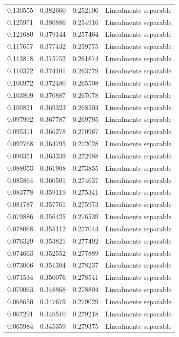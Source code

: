 \begin{tabular}{llll}
0.130555 & 0.382660 & 0.252106 & Linealmente separable \\
0.125971 & 0.380886 & 0.254916 & Linealmente separable \\
0.121680 & 0.379144 & 0.257464 & Linealmente separable \\
0.117657 & 0.377432 & 0.259775 & Linealmente separable \\
0.113878 & 0.375752 & 0.261874 & Linealmente separable \\
0.110322 & 0.374101 & 0.263779 & Linealmente separable \\
0.106972 & 0.372480 & 0.265508 & Linealmente separable \\
0.103809 & 0.370887 & 0.267078 & Linealmente separable \\
0.100821 & 0.369323 & 0.268503 & Linealmente separable \\
0.097992 & 0.367787 & 0.269795 & Linealmente separable \\
0.095311 & 0.366278 & 0.270967 & Linealmente separable \\
0.092768 & 0.364795 & 0.272028 & Linealmente separable \\
0.090351 & 0.363339 & 0.272988 & Linealmente separable \\
0.088053 & 0.361908 & 0.273855 & Linealmente separable \\
0.085864 & 0.360501 & 0.274637 & Linealmente separable \\
0.083778 & 0.359119 & 0.275341 & Linealmente separable \\
0.081787 & 0.357761 & 0.275973 & Linealmente separable \\
0.079886 & 0.356425 & 0.276539 & Linealmente separable \\
0.078068 & 0.355112 & 0.277044 & Linealmente separable \\
0.076329 & 0.353821 & 0.277492 & Linealmente separable \\
0.074663 & 0.352552 & 0.277889 & Linealmente separable \\
0.073066 & 0.351304 & 0.278237 & Linealmente separable \\
0.071534 & 0.350076 & 0.278541 & Linealmente separable \\
0.070063 & 0.348868 & 0.278804 & Linealmente separable \\
0.068650 & 0.347679 & 0.279029 & Linealmente separable \\
0.067291 & 0.346510 & 0.279218 & Linealmente separable \\
0.065984 & 0.345359 & 0.279375 & Linealmente separable \\

\end{tabular}

